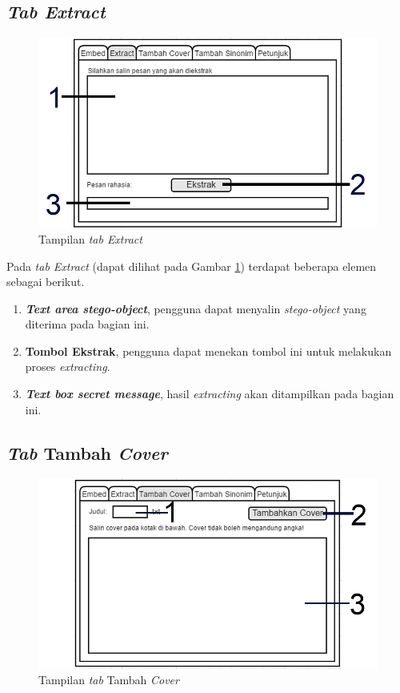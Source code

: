 \subsection{\textit{Tab Extract}}

\begin{figure}[H]
	\centering
	\includegraphics[scale=1.8]{Gambar/tab-extract}
	\caption{Tampilan \textit{tab Extract}} 
	\label{fig:2-tab-extract}
\end{figure}

Pada \textit{tab Extract} (dapat dilihat pada Gambar \ref{fig:2-tab-extract}) terdapat beberapa elemen sebagai berikut.

\begin{enumerate}
	\item \textbf{\textit{Text area stego-object}}, pengguna dapat menyalin \textit{stego-object} yang diterima pada bagian ini.
	\item \textbf{Tombol Ekstrak}, pengguna dapat menekan tombol ini untuk melakukan proses \textit{extracting}.
	\item \textbf{\textit{Text box secret message}}, hasil \textit{extracting} akan ditampilkan pada bagian ini.
\end{enumerate} 

\subsection{\textit{Tab} Tambah \textit{Cover}}

\begin{figure}[H]
	\centering
	\includegraphics[scale=1.8]{Gambar/tab-tambah-cover}
	\caption{Tampilan \textit{tab} Tambah \textit{Cover}} 
	\label{fig:3-tab-tambah-cover}
\end{figure}

